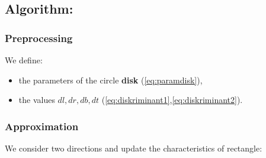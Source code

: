 \documentclass{report}
\begin{document}
\subsection*{Algorithm:}

\subsubsection*{Preprocessing}

We define:

\begin{itemize}
	\item the parameters of the circle {\bfseries disk} (\ref{eq:paramdisk}),
	
	\item the values $dl, dr, db, dt$ (\ref{eq:diskriminant1},\ref{eq:diskriminant2}).	
\end{itemize}

\subsubsection*{Approximation}

We consider two directions and update the characteristics of rectangle:
\end{document}

